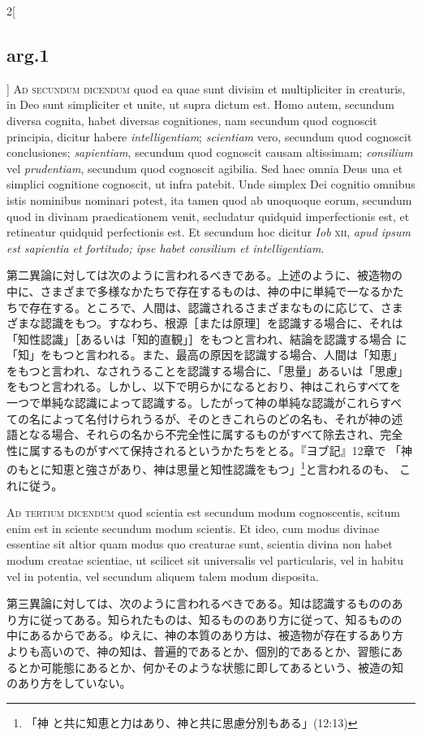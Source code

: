 \documentclass[paper=a4paper,fontsize=10pt,jafontsize=9pt,titlepage]{jlreq}
\begin{document}
\begin{paracol}{2}[\subsection{arg.1}]
{\scshape Ad secundum dicendum} quod ea quae sunt divisim et
multipliciter in creaturis, in Deo sunt simpliciter et unite, ut supra
dictum est. Homo autem, secundum diversa cognita, habet diversas
cognitiones, nam secundum quod cognoscit principia, dicitur habere
{\itshape intelligentiam}; {\itshape scientiam} vero, secundum quod
cognoscit conclusiones; {\itshape sapientiam}, secundum quod cognoscit
causam altissimam; {\itshape consilium} vel {\itshape prudentiam},
secundum quod cognoscit agibilia. Sed haec omnia Deus una et simplici
cognitione cognoscit, ut infra patebit. Unde simplex Dei cognitio
omnibus istis nominibus nominari potest, ita tamen quod ab unoquoque
eorum, secundum quod in divinam praedicationem venit, secludatur
quidquid imperfectionis est, et retineatur quidquid perfectionis
est. Et secundum hoc dicitur {\itshape Iob} {\scshape xii}, {\itshape
apud ipsum est sapientia et fortitudo; ipse habet consilium et
intelligentiam}.

\switchcolumn

第二異論に対しては次のように言われるべきである。上述のように、被造物の
中に、さまざまで多様なかたちで存在するものは、神の中に単純で一なるかた
ちで存在する。ところで、人間は、認識されるさまざまなものに応じて、さま
ざまな認識をもつ。すなわち、根源［または原理］を認識する場合に、それは
「知性認識」［あるいは「知的直観」］をもつと言われ、結論を認識する場合
に「知」をもつと言われる。また、最高の原因を認識する場合、人間は「知恵」
をもつと言われ、なされうることを認識する場合に、「思量」あるいは「思慮」
をもつと言われる。しかし、以下で明らかになるとおり、神はこれらすべてを
一つで単純な認識によって認識する。したがって神の単純な認識がこれらすべ
ての名によって名付けられうるが、そのときこれらのどの名も、それが神の述
語となる場合、それらの名から不完全性に属するものがすべて除去され、完全
性に属するものがすべて保持されるというかたちをとる。『ヨブ記』12章で
「神のもとに知恵と強さがあり、神は思量と知性認識をもつ」\footnote{「神
と共に知恵と力はあり、神と共に思慮分別もある」(12:13)}と言われるのも、
これに従う。

\switchcolumn*[\subsection{ad.3}]

{\scshape Ad tertium dicendum} quod scientia est secundum modum
cognoscentis, scitum enim est in sciente secundum modum scientis. Et
ideo, cum modus divinae essentiae sit altior quam modus quo creaturae
sunt, scientia divina non habet modum creatae scientiae, ut scilicet
sit universalis vel particularis, vel in habitu vel in potentia, vel
secundum aliquem talem modum disposita.

\switchcolumn

第三異論に対しては、次のように言われるべきである。知は認識するもののあ
り方に従ってある。知られたものは、知るもののあり方に従って、知るものの
中にあるからである。ゆえに、神の本質のあり方は、被造物が存在するあり方
よりも高いので、神の知は、普遍的であるとか、個別的であるとか、習態にあ
るとか可能態にあるとか、何かそのような状態に即してあるという、被造の知
のあり方をしていない。

\end{paracol}
\end{document}
